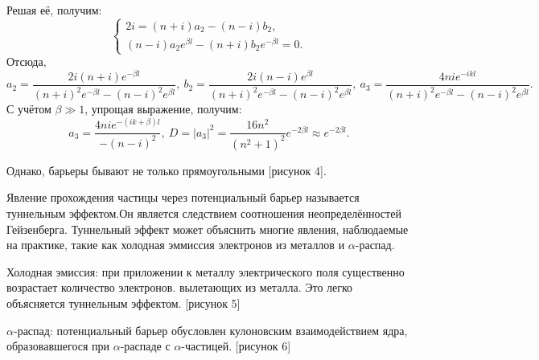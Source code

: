 Решая её, получим:
\[
    \left\{
    \begin{array}{l}
        2i = (n+i)a_2 - (n-i)b_2, \\
        (n-i)a_2 e^{\beta l} - (n+i)b_2 e^{-\beta l} = 0.
    \end{array}
    \right.
\]
Отсюда,
\[
    a_2 = \frac{2i(n+i)e^{-\beta l}}{(n+i)^2e^{-\beta l} - (n-i)^2e^{\beta l}},\  
    b_2 = \frac{2i(n-i)e^{\beta l}}{(n+i)^2e^{-\beta l} - (n-i)^2e^{\beta l}},\ 
    a_3 = \frac{4nie^{-ikl}}{(n+i)^2 e^{-\beta l} - (n-i)^2 e^{\beta l}}.
\]
С учётом \( \beta \gg 1 \), упрощая выражение, получим:
\[
    a_3 = \frac{4nie^{-(ik+\beta)l}}{-(n-i)^2}, \ 
    D = |a_3|^2 = \frac{16n^2}{(n^2 + 1)^2} e^{-2\beta l} \approx e^{-2\beta l}. 
\]

Однако, барьеры бывают не только прямоугольными [рисунок 4].

Явление прохождения частицы через потенциальный барьер называется туннельным
эффектом.Он является следствием соотношения неопределённостей Гейзенберга.
Туннельный эффект может объяснить многие явления, наблюдаемые на практике, такие
как холодная эммиссия электронов из металлов и \( \alpha \)-распад.

Холодная эмиссия: при приложении к металлу электрического поля существенно
возрастает количество электронов. вылетающих из металла. Это легко объясняется 
туннельным эффектом. [рисунок 5]

\( \alpha \)-распад: потенциальный барьер обусловлен кулоновским взаимодействием
ядра, образовавшегося при \( \alpha \)-распаде с \( \alpha \)-частицей.
[рисунок 6]
\newpage
